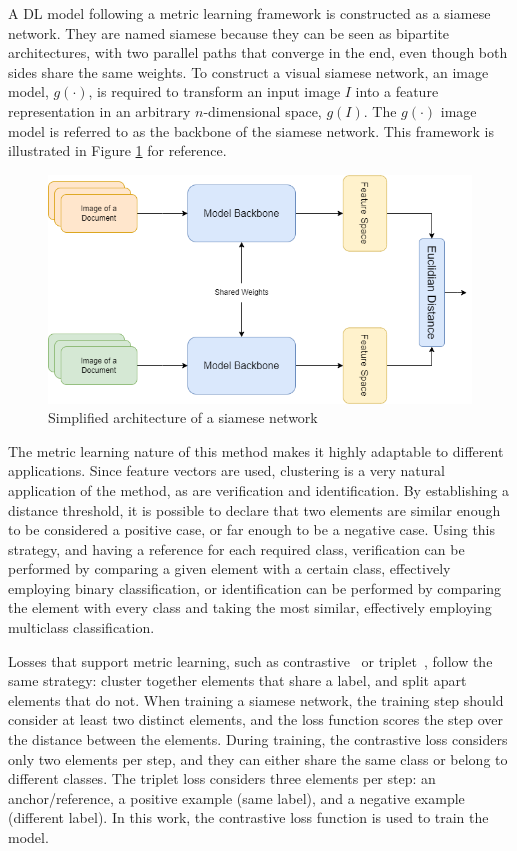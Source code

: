 A \gls{DL} model following a metric learning framework is constructed as a siamese network. They are named siamese because they can be seen as bipartite architectures, with two parallel paths that converge in the end, even though both sides share the same weights. To construct a visual siamese network, an image model, \( g(\cdot) \), is required to transform an input image \( I \) into a feature representation in an arbitrary $n$-dimensional space, \( g(I) \). The  \( g(\cdot) \) image model is referred to as the backbone of the siamese network. This framework is illustrated in Figure \ref{fig:siamese} for reference.

\begin{figure}[htbp]
\centering
\includegraphics[width=0.9\linewidth]{images/siamese.png}
\caption{Simplified architecture of a siamese network}
\label{fig:siamese}
\end{figure}

The metric learning nature of this method makes it highly adaptable to different applications. Since feature vectors are used, clustering is a very natural application of the method, as are verification and identification. By establishing a distance threshold, it is possible to declare that two elements are similar enough to be considered a positive case, or far enough to be a negative case. Using this strategy, and having a reference for each required class, verification can be performed by comparing a given element with a certain class, effectively employing binary classification, or identification can be performed by comparing the element with every class and taking the most similar, effectively employing multiclass classification.

Losses that support metric learning, such as contrastive~\cite{chopra_learning_2005} or triplet~\cite{hoffer_deep_2018}, follow the same strategy: cluster together elements that share a label, and split apart elements that do not. When training a siamese network, the training step should consider at least two distinct elements, and the loss function scores the step over the distance between the elements. During training, the contrastive loss considers only two elements per step, and they can either share the same class or belong to different classes. The triplet loss considers three elements per step: an anchor/reference, a positive example (same label), and a negative example (different label). In this work, the contrastive loss function is used to train the model.

